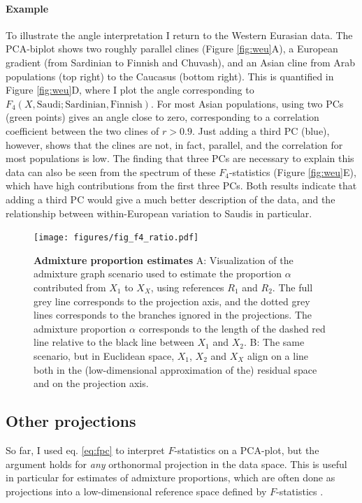 \documentclass[12pt,fullpage, a4paper]{article}
\begin{document}
\paragraph{Example}
To illustrate the angle interpretation I return to the Western Eurasian data. The PCA-biplot shows two roughly parallel clines (Figure \ref{fig:weu}A), a European gradient (from Sardinian to Finnish and Chuvash), and an Asian cline from Arab populations (top right) to the Caucasus  (bottom right). This is quantified in Figure \ref{fig:weu}D, where I plot the angle corresponding to $F_4(X, \text{Saudi}; \text{Sardinian}, \text{Finnish})$. For most Asian populations, using two PCs (green points) gives an angle close to zero, corresponding to a correlation coefficient between the two clines of $r>0.9$. Just adding a third PC (blue), however, shows that the clines are not, in fact, parallel, and the correlation for most populations is low. The finding that three PCs are necessary to explain this data can also be seen from the spectrum of these $F_4$-statistics (Figure \ref{fig:weu}E), which have high contributions from the first three PCs. Both results indicate that adding a third PC would give a much better description of the data, and the relationship between within-European variation to Saudis in particular.

\begin{figure}[!ht]
	\texttt{[image: figures/fig\_f4\_ratio.pdf]}	
	\caption{\textbf{Admixture proportion estimates} A: Visualization of the admixture graph scenario used to estimate the proportion $\alpha$ contributed from $X_1$ to $X_X$, using references $R_1$ and $R_2$. The full grey line corresponds to the projection axis, and the dotted grey lines corresponds to the branches ignored in the projections. The admixture proportion $\alpha$ corresponds to the length of the dashed red line relative to the black line between $X_1$ and $X_2$. B: The same scenario, but in Euclidean space, $X_1$, $X_2$ and $X_X$ align on a line both in the (low-dimensional approximation of the) residual space and on the projection axis. 
	}	
	\label{fig:ratio}
\end{figure}

\subsection{Other projections}
So far, I used eq. \ref{eq:fpc} to interpret $F$-statistics on a PCA-plot, but the argument holds for \emph{any} orthonormal projection in the data space. This is useful in particular for estimates of admixture proportions, which are often done as projections into a low-dimensional reference space defined by $F$-statistics \citep{patterson2012, petr2019, harney2021, oteo-garcia2021}. 
\end{document}
